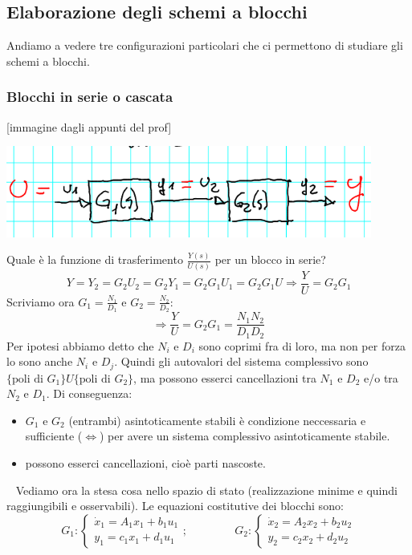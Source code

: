 \subsection{Elaborazione degli schemi a blocchi}
Andiamo a vedere tre configurazioni particolari che ci permettono di studiare gli schemi a blocchi.
\subsubsection{Blocchi in serie o cascata}
[immagine dagli appunti del prof]
\begin{center}
    \includegraphics[height=3cm]{../lezione11/img3.PNG}
\end{center}
Quale è la funzione di trasferimento $\frac{Y(s)}{U(s)}$ per un blocco in serie?
\[
    Y= Y_2 = G_2U_2 = G_2 Y_1 = G_2G_1 U_1 = G_2G_1 U \Longrightarrow \frac{Y}{U} = G_2G_1
\]
Scriviamo ora $G_1 = \frac{N_1}{D_1}$ e $G_2= \frac{N_2}{D_2}$:
\[
    \Longrightarrow \frac{Y}{U} = G_2 G_1 = \frac{N_1N_2}{D_1D_2}
\]
Per ipotesi abbiamo detto che $N_i$ e $D_i$ sono coprimi fra di loro, ma non per forza lo sono anche $N_i$ e $D_j$.\newline
Quindi gli autovalori del sistema complessivo sono $\{\text{poli di $G_1$}\} U \{\text{poli di $G_2$}\}$, ma possono esserci cancellazioni tra $N_1$ e $D_2$ e/o tra $N_2$ e $D_1$.\newline
\newline
Di conseguenza:
\begin{itemize}
    \item $G_1$ e $G_2$ (entrambi) asintoticamente stabili è condizione neccessaria e sufficiente ($\Leftrightarrow$) per avere un sistema complessivo asintoticamente stabile.
    \item possono esserci cancellazioni, cioè parti nascoste.
\end{itemize} 
\ \newline
Vediamo ora la stesa cosa nello spazio di stato (realizzazione minime e quindi raggiungibili e osservabili).
Le equazioni costitutive dei blocchi sono:
\[
    G_1: \begin{cases}
        \dot{x}_1 = A_1 x_1 + b_1 u_1\\
        y_1 = c_1 x_1 + d_1 u_1
    \end{cases}; \;\;\;\;\;\;\;\;\;\;\;\;\;\;\;G_2 : \begin{cases}
        \dot{x}_2 = A_2 x_2 + b_2 u_2\\
        y_2 = c_2 x_2 + d_2 u_2
    \end{cases}
\]
